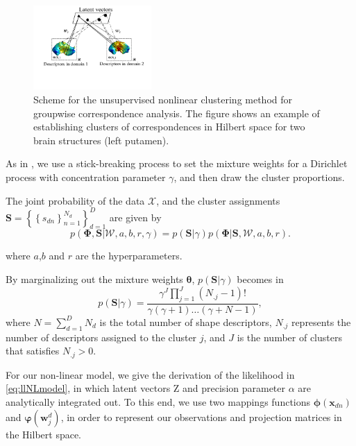 \documentclass[twoside]{article}
\newcommand{\Z}{\boldsymbol{\mathrm{Z}}}
\newcommand{\indobj}{\mathbf{x}_{dn}}
\newcommand{\phixnd}{\boldsymbol{\phi}\left(\indobj\right)}
\newcommand{\phiwld}[1]{\boldsymbol{\varphi}\left(\mathbf{w}_{#1}^d\right)}
\begin{document}
\begin{figure}[h!]
\centering
\includegraphics[width=0.4\textwidth]{fig/NLphdModelScheme}
\caption{Scheme for the unsupervised nonlinear clustering method for groupwise correspondence analysis. The
  figure shows an example of establishing clusters of correspondences in Hilbert space for two brain structures (left putamen).}
\label{fig:pipeline}
\end{figure} 

As in \cite{Iwata16}, we use a stick-breaking process to set the mixture weights for a Dirichlet process  with concentration parameter $\gamma$, and then draw the cluster proportions.

The joint probability of the data $\mathcal{X}$, and the cluster assignments $\mathbf{S}=\left\{\left\{s_{dn}\right\}_{n=1}^{N_{d}}\right\}_{d=1}^{D}$ are given by
\begin{equation}
p\left(\boldsymbol{\Phi},\mathbf{S}|\boldsymbol{\mathcal{W}},a,b,r,\gamma\right)=
p\left(\mathbf{S}|\gamma\right)p\left(\boldsymbol{\Phi}|\mathbf{S},\boldsymbol{\mathcal{W}},a,b,r\right).
\label{eq:jointP}
\end{equation}

where $a$,$b$ and $r$ are the hyperparameters.

By marginalizing out the mixture weights $\boldsymbol{\theta}$, $p\left(\mathbf{S}|\gamma\right)$ becomes in
\begin{equation}
p\left(\mathbf{S}|\gamma\right) =\frac{\gamma^{J}\prod\limits_{j=1}^{J}{\left(N_{.j}-1\right)!}}{\gamma\left(\gamma+1\right)\dots\left(\gamma+N-1\right)},
\end{equation}
where $N=\sum\limits_{d=1}^{D}N_d$ is the total number of shape
descriptors, $N_{.j}$ represents the number of descriptors assigned to
the cluster $j$, and $J$ is the number of clusters that satisfies
$N_{.j}>0$.


For our non-linear model, we give the derivation of the likelihood in \eqref{eq:llNLmodel}, in which latent vectors $\Z$ and precision parameter $\alpha$ are analytically integrated out. To this end, we use two mappings functions $\phixnd$ and $\phiwld{j}$, in order to represent our observations and projection matrices in the Hilbert space.
\end{document}
